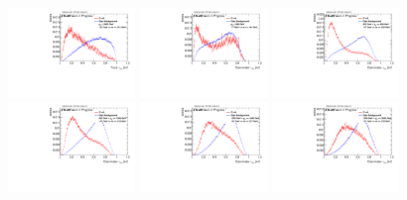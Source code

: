 \begin{figure}[H]
\includegraphics[width=0.3\textwidth]{sascha_input/Appendix/Distributions/top/distributions/beta2/h_normal_tj_nSub32_2_bin6.pdf} 
\bigskip
\includegraphics[width=0.3\textwidth]{sascha_input/Appendix/Distributions/top/distributions/beta2/h_recoJet_nSub32_2_bin1.pdf} \hspace{1mm}
\includegraphics[width=0.3\textwidth]{sascha_input/Appendix/Distributions/top/distributions/beta2/h_recoJet_nSub32_2_bin2.pdf} \hspace{1mm}
\includegraphics[width=0.3\textwidth]{sascha_input/Appendix/Distributions/top/distributions/beta2/h_recoJet_nSub32_2_bin3.pdf} 
\bigskip
\includegraphics[width=0.3\textwidth]{sascha_input/Appendix/Distributions/top/distributions/beta2/h_recoJet_nSub32_2_bin4.pdf} \hspace{6mm}
\includegraphics[width=0.3\textwidth]{sascha_input/Appendix/Distributions/top/distributions/beta2/h_recoJet_nSub32_2_bin5.pdf} \hspace{6mm}

\end{figure}
